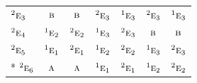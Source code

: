 \documentclass[10pt,a4paper]{article}
\numberwithin{equation}{section}
\newcommand{\irr}[1]{\text{\normalfont\scshape #1}}
\newcommand{\conjpair}[1]{{}^{#1}}
\begin{document}
{\begin{longtable}{@{}lcccccc@{}}
$\conjpair{2}\irr{e}_{3}$ & $\irr{b}$ & $\irr{b}$ & $\conjpair{2}\irr{e}_{3}$ & $\conjpair{1}\irr{e}_{3}$ & $\conjpair{2}\irr{e}_{3}$ & $\conjpair{1}\irr{e}_{3}$\\
$\conjpair{2}\irr{e}_{4}$ & $\conjpair{1}\irr{e}_{2}$ & $\conjpair{2}\irr{e}_{2}$ & $\conjpair{1}\irr{e}_{3}$ & $\conjpair{2}\irr{e}_{3}$ & $\irr{b}$ & $\irr{b}$\\
$\conjpair{2}\irr{e}_{5}$ & $\conjpair{1}\irr{e}_{1}$ & $\conjpair{2}\irr{e}_{1}$ & $\conjpair{1}\irr{e}_{2}$ & $\conjpair{2}\irr{e}_{2}$ & $\conjpair{1}\irr{e}_{3}$ & $\conjpair{2}\irr{e}_{3}$\\*
$\conjpair{2}\irr{e}_{6}$ & $\irr{a}$ & $\irr{a}$ & $\conjpair{1}\irr{e}_{1}$ & $\conjpair{2}\irr{e}_{1}$ & $\conjpair{1}\irr{e}_{2}$ & $\conjpair{2}\irr{e}_{2}$\\
\bottomrule\end{longtable}}
\end{document}
